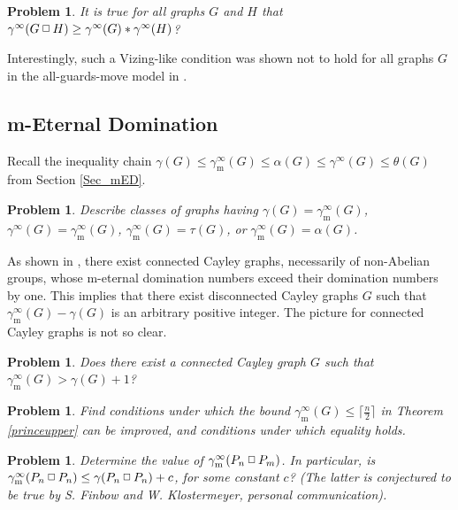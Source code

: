 \documentclass[12pt]{article}%
\newtheorem{problem}[theorem]{Problem}
\providecommand{\boksie}{\ensuremath{\mathbin{\raisebox{0.3mm}{$\scriptstyle\square$}}}}
\begin{document}
\begin{problem}
It is true for all graphs $G$ and $H$ that $\gamma^{\infty}(G\boksie H)\geq
\gamma^{\infty}(G)\ast\gamma^{\infty}(H)$?
\end{problem}

Interestingly, such a Vizing-like condition was shown not to hold for all
graphs $G$ in the all-guards-move model in \cite{KM8}.

\subsection{m-Eternal Domination}

\label{SecOpen_m-eternal}Recall the inequality chain $\gamma(G)\leq
\gamma_{\mathrm{m}}^{\infty}(G)\leq\alpha(G)\leq\gamma^{\infty}(G)\leq
\theta(G)$ from Section \ref{Sec_mED}.

\begin{problem}
Describe classes of graphs having $\gamma(G)=\gamma_{\mathrm{m}}^{\infty}(G)$,
$\gamma^{\infty}(G)=\gamma_{\mathrm{m}}^{\infty}(G)$, $\gamma_{\mathrm{m}%
}^{\infty}(G)=\tau(G)$, or $\gamma_{\mathrm{m}}^{\infty}(G)=\alpha(G)$.
\end{problem}

As shown in \cite{BSL}, there exist connected Cayley graphs, necessarily of
non-Abelian groups, whose m-eternal domination numbers exceed their domination
numbers by one. This implies that there exist disconnected Cayley graphs $G$
such that $\gamma_{\mathrm{m}}^{\infty}(G)-\gamma(G)$ is an arbitrary positive
integer. The picture for connected Cayley graphs is not so clear.

\begin{problem}
Does there exist a connected Cayley graph $G$ such that $\gamma_{\mathrm{m}%
}^{\infty}(G)>\gamma(G)+1$?
\end{problem}

\begin{problem}
Find conditions under which the bound $\gamma_{\mathrm{m}}^{\infty}%
(G)\leq\lceil\frac{n}{2}\rceil$ in Theorem \ref{princeupper} can be improved,
and conditions under which equality holds.
\end{problem}

\begin{problem}
Determine the value of $\gamma_{\mathrm{m}}^{\infty}(P_{n}\boksie P_{m})$. In
particular, is $\gamma_{\mathrm{m}}^{\infty}(P_{n}\boksie P_{n})\leq
\gamma(P_{n}\boksie P_{n})+c$, for some constant $c$? (The latter is
conjectured to be true by S. Finbow and W. Klostermeyer, personal communication).
\end{problem}
\end{document}

